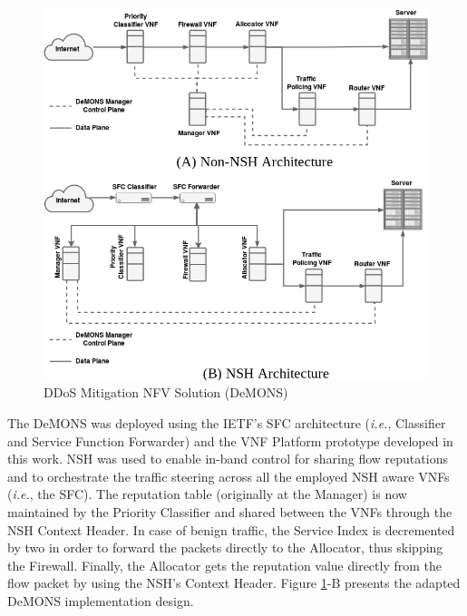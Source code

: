 \begin{figure}[!h]
\centering
\includegraphics[width=.5\textwidth]{images/DeMONS.png}
\caption{DDoS Mitigation NFV Solution (DeMONS)}
\label{FIG:DeMONS}
\end{figure}


The DeMONS was deployed using the IETF's SFC architecture (\textit{i.e.}, Classifier and Service Function Forwarder) \cite{Joel-2015} and the VNF Platform prototype developed in this work. NSH was used to enable in-band control for sharing flow reputations and to orchestrate the traffic steering across all the employed NSH aware VNFs (\textit{i.e.}, the SFC). The reputation table (originally at the Manager) is now maintained by the Priority Classifier and shared between the VNFs through the NSH Context Header. In case of benign traffic, the Service Index is decremented by two in order to forward the packets directly to the Allocator, thus skipping the Firewall. Finally, the Allocator gets the reputation value directly from the flow packet by using the NSH's Context Header. Figure \ref{FIG:DeMONS}-B presents the adapted DeMONS implementation design.


